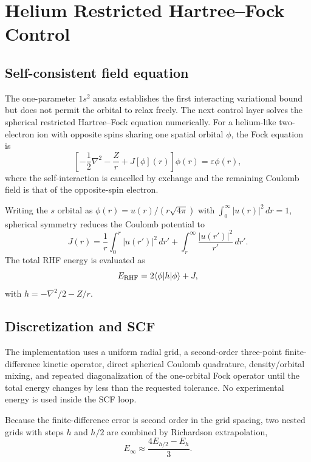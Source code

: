 \chapter{Helium Restricted Hartree--Fock Control}

\section{Self-consistent field equation}
The one-parameter $1s^2$ ansatz establishes the first interacting variational bound but does not permit the orbital to relax freely. The next control layer solves the spherical restricted Hartree--Fock equation numerically. For a helium-like two-electron ion with opposite spins sharing one spatial orbital $\phi$, the Fock equation is
\begin{equation}
\left[-\frac12\nabla^2-\frac{Z}{r}+J[\phi](r)\right]\phi(r)=\varepsilon\phi(r),
\end{equation}
where the self-interaction is cancelled by exchange and the remaining Coulomb field is that of the opposite-spin electron.

Writing the $s$ orbital as $\phi(r)=u(r)/(r\sqrt{4\pi})$ with $\int_0^\infty |u(r)|^2\,dr=1$, spherical symmetry reduces the Coulomb potential to
\begin{equation}
J(r)=\frac{1}{r}\int_0^r |u(r')|^2\,dr'+\int_r^\infty\frac{|u(r')|^2}{r'}\,dr'.
\end{equation}
The total RHF energy is evaluated as
\begin{equation}
E_{\rm RHF}=2\langle\phi|h|\phi\rangle+J,
\end{equation}
with $h=-\nabla^2/2-Z/r$.

\section{Discretization and SCF}
The implementation uses a uniform radial grid, a second-order three-point finite-difference kinetic operator, direct spherical Coulomb quadrature, density/orbital mixing, and repeated diagonalization of the one-orbital Fock operator until the total energy changes by less than the requested tolerance. No experimental energy is used inside the SCF loop.

Because the finite-difference error is second order in the grid spacing, two nested grids with steps $h$ and $h/2$ are combined by Richardson extrapolation,
\begin{equation}
E_{\infty}\approx\frac{4E_{h/2}-E_h}{3}.
\end{equation}

